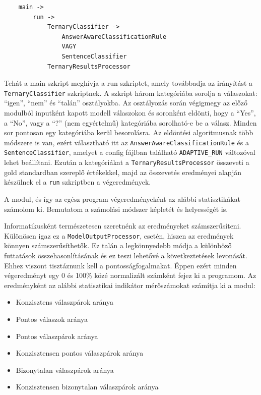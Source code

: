 \documentclass[12pt]{report}
\begin{document}
    \begin{verbatim}
    main ->
        run ->
            TernaryClassifier ->
                AnswerAwareClassificationRule
                VAGY
                SentenceClassifier
            TernaryResultsProcessor
    \end{verbatim}


    Tehát a main szkript meghívja a run szkriptet, amely továbbadja az irányítást a \texttt{\allowbreak TernaryClassifier} szkriptnek. A szkript három kategóriába sorolja a válaszokat: ``igen'', ``nem'' és ``talán'' osztályokba.
    Az osztályozás során végigmegy az előző modulból inputként kapott modell válaszokon és soronként eldönti, hogy a ``Yes'', a ``No'', vagy a ``?''  (nem egyértelmű) kategóriába sorolható-e be a válasz. Minden sor pontosan egy kategóriába kerül besorolásra.
    Az eldöntési algoritmusnak több módszere is van, ezért választható itt az \texttt{\allowbreak AnswerAwareClassificationRule} és a \texttt{\allowbreak SentenceClassifier}, amelyet a config fájlban található \texttt{\allowbreak ADAPTIVE\_RUN} változóval lehet beállítani.
    Ezután a kategóriákat a \texttt{\allowbreak TernaryResultsProcessor} összeveti a gold standardban szereplő értékekkel, majd az összevetés eredményei alapján készülnek el a \texttt{\allowbreak run} szkriptben a végeredmények.


    A modul, és így az egész program végeredményeként az alábbi statisztikákat számolom ki.
    Bemutatom a számolási módszer képletét és helyességét is.

    Informatikusként természetesen szeretnénk az eredményeket számszerűsíteni.
    Különösen igaz ez a \texttt{\allowbreak ModelOutputProcessor}, esetén, hiszen az eredmények könnyen számszerűsíthetők.
    Ez talán a legkönnyedebb módja a különböző futtatások összehasonlításának és ez teszi lehetővé a következtetések levonását.
    Ehhez viszont tisztáznunk kell a pontosságfogalmakat.
    Éppen ezért minden végeredményt egy 0 és 100\% közé normalizált számként fejez ki a programom.
    Az eredményként az alábbi statisztikai indikátor mérőszámokat számítja ki a modul:
    \begin{itemize}
        \item Konzisztens válaszpárok aránya
        \item Pontos válaszok aránya
        \item Pontos válaszpárok aránya
        \item Konzisztensen pontos válaszpárok aránya
        \item Bizonytalan válaszpárok aránya
        \item Konzisztensen bizonytalan válaszpárok aránya
    \end{itemize}
\end{document}
